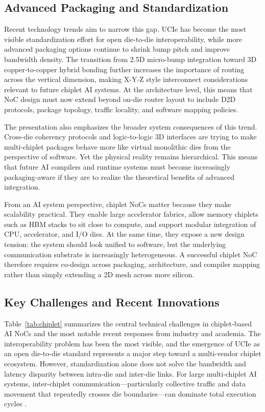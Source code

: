 \subsection{Advanced Packaging and Standardization}

Recent technology trends aim to narrow this gap. UCIe has become the most visible standardization effort for open die-to-die interoperability, while more advanced packaging options continue to shrink bump pitch and improve bandwidth density. The transition from 2.5D micro-bump integration toward 3D copper-to-copper hybrid bonding further increases the importance of routing across the vertical dimension, making X-Y-Z style interconnect considerations relevant to future chiplet AI systems. At the architecture level, this means that NoC design must now extend beyond on-die router layout to include D2D protocols, package topology, traffic locality, and software mapping policies.

The presentation also emphasizes the broader system consequences of this trend. Cross-die coherency protocols and logic-to-logic 3D interfaces are trying to make multi-chiplet packages behave more like virtual monolithic dies from the perspective of software. Yet the physical reality remains hierarchical. This means that future AI compilers and runtime systems must become increasingly packaging-aware if they are to realize the theoretical benefits of advanced integration.

From an AI system perspective, chiplet NoCs matter because they make scalability practical. They enable large accelerator fabrics, allow memory chiplets such as HBM stacks to sit close to compute, and support modular integration of CPU, accelerator, and I/O dies. At the same time, they expose a new design tension: the system should look unified to software, but the underlying communication substrate is increasingly heterogeneous. A successful chiplet NoC therefore requires co-design across packaging, architecture, and compiler mapping rather than simply extending a 2D mesh across more silicon.

\subsection{Key Challenges and Recent Innovations}

Table~\ref{tab:chiplet} summarizes the central technical challenges in chiplet-based AI NoCs and the most notable recent responses from industry and academia. The interoperability problem has been the most visible, and the emergence of UCIe as an open die-to-die standard represents a major step toward a multi-vendor chiplet ecosystem. However, standardization alone does not solve the bandwidth and latency disparity between intra-die and inter-die links. For large multi-chiplet AI systems, inter-chiplet communication---particularly collective traffic and data movement that repeatedly crosses die boundaries---can dominate total execution cycles \cite{shao2019simba,sharma2022swap}.


